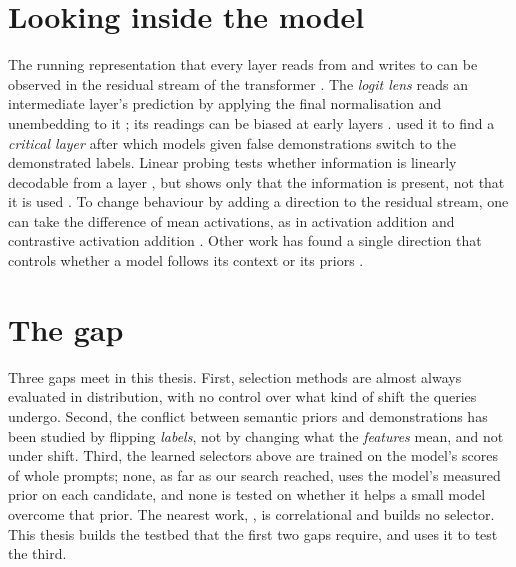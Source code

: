 \section{Looking inside the model}
\label{sec:bg-mech}
The running representation that every layer reads from and writes to can be observed in the residual stream of the transformer \citep{vaswani2017attention, elhage2021mathematical}. The \emph{logit lens} reads an intermediate layer's prediction by applying the final normalisation and unembedding to it \citep{nostalgebraist2020logit}; its readings can be biased at early layers \citep{belrose2023eliciting}.
\citet{halawi2024overthinking} used it to find a \emph{critical layer} after which models given false demonstrations switch to the demonstrated labels. Linear probing tests whether information is linearly decodable from a layer \citep{alain2017understanding}, but shows only that the information is present, not that it is used \citep{belinkov2022probing}. To change behaviour by adding a direction to the residual stream, one can take the difference of mean activations, as in activation addition \citep{turner2023activation} and contrastive activation addition \citep{rimsky2024steering}. Other work has found a single direction that controls whether a model follows its context or its priors \citep{minder2025controllable}.

\section{The gap}
\label{sec:bg-gap}

Three gaps meet in this thesis.
First, selection methods are almost always evaluated in distribution, with no control over what kind of shift the queries undergo.
Second, the conflict between semantic priors and demonstrations has been studied by flipping \emph{labels}, not by changing what the \emph{features} mean, and not under shift. Third, the learned selectors above are trained on the model's scores of whole prompts; none, as far as our search reached, uses the model's measured prior on each candidate, and none is tested on whether it helps a small model overcome that prior. The nearest work, \citet{kato2025affinity}, is correlational and builds no selector. This thesis builds the testbed that the first two gaps require, and uses it to test the third.